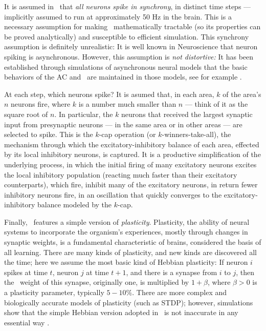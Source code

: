 \documentclass{article}
\begin{document}
It is assumed in \name\  that \emph{all neurons spike in synchrony}, in distinct time steps --- implicitly assumed to run at approximately 50 Hz in the brain.  This is a necessary assumption for making \name\  mathematically tractable (so its properties can be proved analytically) and susceptible to efficient simulation. This synchrony assumption is definitely unrealistic: It is well known in Neuroscience that neuron spiking is asynchronous.  However, this assumption is \emph{not distortive:} It has been established through simulations of asynchronous neural models that the basic behaviors of the AC and \name\  are maintained in those models, see for example \citet{IsonMaassPap}.  

At each step, which neurons spike? It is asumed that, in each area, $k$ of the area's $n$ neurons fire, where $k$ is a number much smaller than $n$ --- think of it as the square root of $n$. In particular, the $k$ neurons that received the largest synaptic input from presynaptic neurons --- in the same area or in other areas --- are selected to spike.  This is the $k$-cap operation (or $k$-winners-take-all), the mechanism through which the excitatory-inhibitory balance of each area, effected by its local inhibitory neurons, is captured.  It is a productive simplification of the underlying process, in which the initial firing of many excitatory neurons excites the local inhibitory population (reacting much faster than their excitatory counterparts), which fire, inhibit many of the excitatory neurons, in return fewer inhibitory neurons fire, in an oscillation that quickly converges to the excitatory-inhibitory balance modeled by the $k$-cap.

Finally, \name\ features a simple version of \emph{plasticity}. Plasticity, the ability of neural systems to incorporate the organism's experiences, mostly through changes in synaptic weights, is a fundamental characteristic of brains, considered the basis of all learning.  There are many kinds of plasticity, and new kinds are discovered all the time; here we assume the most basic kind of Hebbian plasticity: If neuron $i$ spikes at time $t$, neuron $j$ at time $t+1$, and there is a synapse from $i$ to $j$, then the {\ weight} of this synapse, originally one, is multiplied by $1+\beta$, where $\beta>0$ is a plasticity parameter, typically $5-10\%$. There are more complex and biologically accurate models of plasticity (such as STDP); however, simulations show that the simple Hebbian version adopted in \name\ is not inaccurate in any essential way \citep{constantinides2021effects}.
\end{document}
